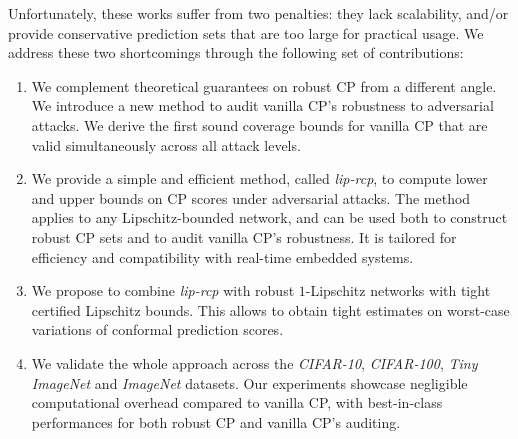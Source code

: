 Unfortunately, these works suffer from two penalties: they lack scalability, and/or provide conservative prediction sets that are too large for practical usage. We address these two shortcomings through the following set of contributions:

\begin{enumerate}
    \item We complement theoretical guarantees on robust CP from a different angle. We introduce a new method to audit vanilla CP's robustness to adversarial attacks. We derive the first sound coverage bounds for vanilla CP that are valid simultaneously across all attack levels.
    \item We provide a simple and efficient method, called \emph{lip-rcp}, to compute lower and upper bounds on CP scores under adversarial attacks. The method applies to any Lipschitz-bounded network, and can be used both to construct robust CP sets and to audit vanilla CP's robustness. It is tailored for efficiency and compatibility with real-time embedded systems.
    \item We propose to combine \emph{lip-rcp} with robust $1$-Lipschitz  networks with tight certified Lipschitz bounds. This allows to obtain tight estimates on worst-case variations of conformal prediction scores.
    \item We validate the whole approach across the \textsl{CIFAR-10}, \textsl{CIFAR-100}, \textsl{Tiny ImageNet} and \textsl{ImageNet} datasets. Our experiments showcase negligible computational overhead compared to vanilla CP, with best-in-class performances for both robust CP and vanilla CP's auditing.
\end{enumerate}
